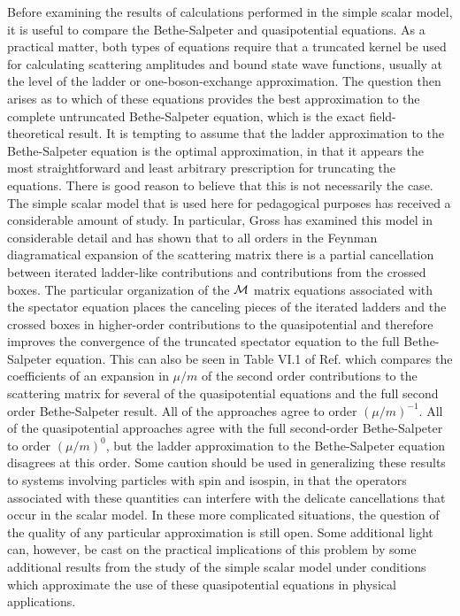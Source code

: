 \documentclass[mythesis.tex]{subfiles}
\begin{document}
Before examining the results of calculations performed in the simple scalar
model, it is useful to compare the Bethe-Salpeter and quasipotential
equations. As a practical matter, both types of equations require that a
truncated kernel be used for calculating scattering amplitudes and bound
state wave functions, usually at the level of the ladder or one-boson-exchange
approximation. The question then arises as to which of these equations
provides the best approximation to the complete untruncated Bethe-Salpeter
equation, which is the exact field-theoretical result. It is tempting to
assume that the ladder approximation to the Bethe-Salpeter equation is the
optimal approximation, in that it appears the most straightforward and least
arbitrary prescription for truncating the equations. There is good reason
to believe that this is not necessarily the case. The simple scalar model
that is used here for pedagogical purposes has received a considerable
amount of study. In particular, Gross \cite{GrossBook} has examined this
model in considerable
detail and has shown that to all orders in the Feynman diagramatical
expansion of the scattering matrix there is a partial cancellation between
iterated ladder-like contributions and contributions from the crossed boxes.
The particular organization of the $\cal M$ matrix equations associated with
the spectator equation places the canceling pieces of the iterated ladders
and the crossed boxes in higher-order contributions to the quasipotential
and therefore improves the convergence of the truncated spectator equation
to the full Bethe-Salpeter equation. This can also be seen in Table VI.1
of Ref. \cite{BrownandJ} which compares the coefficients of an expansion
in $\mu/m$ of
the second order contributions to the scattering matrix for several of
the quasipotential equations and the full second order Bethe-Salpeter
result. All of the approaches agree to order $(\mu/m)^{-1}$. All of the
quasipotential approaches agree with the full second-order Bethe-Salpeter
to order $(\mu/m)^{0}$, but the ladder approximation to the Bethe-Salpeter
equation disagrees at this order. Some caution should be used in
generalizing these results to systems involving particles with spin and
isospin, in that the operators associated with these quantities can interfere
with the delicate cancellations that occur in the scalar model. In these
more complicated situations, the question of the quality of any particular
approximation is still open. Some additional light can, however, be cast on
the practical implications of this problem by some additional results from
the study of the simple scalar model under conditions which approximate
the use of these quasipotential equations in physical applications.
\end{document}
